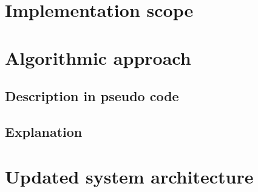 \section{Implementation scope}


\section{Algorithmic approach}

\subsection{Description in pseudo code}

\subsection{Explanation}


\section{Updated system architecture}
